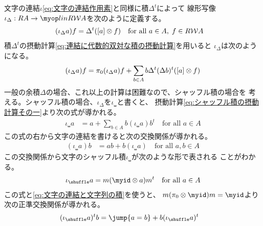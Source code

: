 	文字の連結$\iota$\eqref{eq:文字の連結作用素}と同様に積$\Delta^t$によって
	線形写像$\iota_\Delta:RA\to \lin{R\Word{A}}$を次のように定義する。
	\begin{equation*}\begin{split} %
		(\iota_\Delta a)f &= \Delta^t(\word{a}\otimes f)
		\quad\text{for all }a\in A,\;f\in R\Word{A}
	\end{split}\end{equation*} %
	積$\Delta^t$の摂動計算\eqref{eq:連結に代数的双対な積の摂動計算}を用いると
	$\iota_\Delta$は次のようになる。
	\begin{equation}\label{eq:シャッフル積の摂動計算その一}\begin{split} %
		(\iota_\Delta a)f &= \pi_0(\iota_\Delta a)f 
			+ \sum_{b\in A}b\Delta^t(\Delta b)^t(\word{a}\otimes f) \\
	\end{split}\end{equation} %
	一般の余積$\Delta$の場合、これ以上の計算は困難なので、シャッフル積の場合を
	考える。シャッフル積の場合、$\iota_\Delta$を$\iota_\shuffle$と書くと、
	摂動計算\eqref{eq:シャッフル積の摂動計算その一}より次の式が導かれる。
	\begin{equation*}\begin{split} %
		\iota_\shuffle a &= a + \sum_{b\in A}b(\iota_\shuffle a)b^t
		\quad\text{for all }a\in A
	\end{split}\end{equation*} %
	この式の右から文字の連結を書けると次の交換関係が導かれる。
	\begin{equation*}\begin{split} %
		(\iota_\shuffle a)b &= ab + b(\iota_\shuffle a)
		\quad\text{for all }a,b\in A
	\end{split}\end{equation*} %
	この交換関係から文字のシャッフル積$\iota_\shuffle$が次のような形で表される
	ことがわかる。
	\begin{equation}\label{eq:文字のシャッフル積その一}\begin{split} %
		\iota_\shuffle a = m(\myid\otimes a)m^t \quad\text{for all }a\in A
	\end{split}\end{equation} %
	この式と\eqref{eq:文字の連結と文字列の積}を使うと、
	$m(\pi_0\otimes\myid)m=\myid$より次の正準交換関係が導かれる。
	\begin{equation}\label{eq:文字のシャッフル積その二}\begin{split} %
		(\iota_\shuffle a)^tb &= \jump{a=b} + b(\iota_\shuffle a)^t
	\end{split}\end{equation} %
